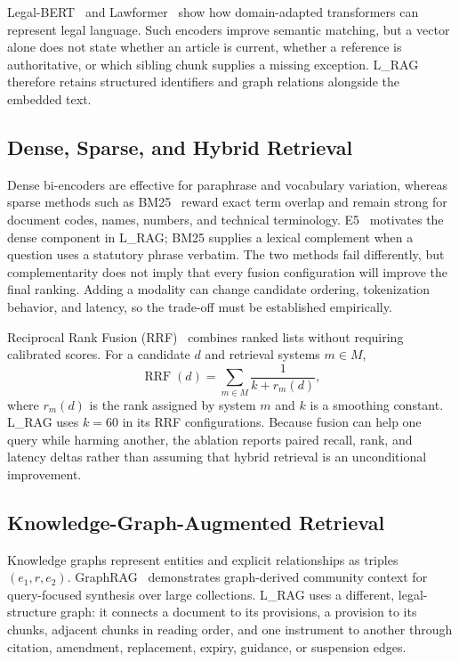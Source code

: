 Legal-BERT~\cite{chalkidis2020legal_bert} and Lawformer~\cite{xiao2021lawformer}
show how domain-adapted transformers can represent legal language. Such
encoders improve semantic matching, but a vector alone does not state whether
an article is current, whether a reference is authoritative, or which sibling
chunk supplies a missing exception. L\_RAG therefore retains structured
identifiers and graph relations alongside the embedded text.

\subsection{Dense, Sparse, and Hybrid Retrieval}
\label{sec:related-hybrid}

Dense bi-encoders are effective for paraphrase and vocabulary variation,
whereas sparse methods such as BM25~\cite{robertson2009probabilistic} reward
exact term overlap and remain strong for document codes, names, numbers, and
technical terminology. E5~\cite{wang2022e5} motivates the dense component in
L\_RAG; BM25 supplies a lexical complement when a question uses a statutory
phrase verbatim. The two methods fail differently, but complementarity does
not imply that every fusion configuration will improve the final ranking.
Adding a modality can change candidate ordering, tokenization behavior, and
latency, so the trade-off must be established empirically.

Reciprocal Rank Fusion (RRF)~\cite{cormack2009reciprocal} combines ranked
lists without requiring calibrated scores. For a candidate $d$ and retrieval
systems $m \in M$,
\begin{equation}
    \operatorname{RRF}(d)=\sum_{m\in M}\frac{1}{k+r_m(d)},
\end{equation}
where $r_m(d)$ is the rank assigned by system $m$ and $k$ is a smoothing
constant. L\_RAG uses $k=60$ in its RRF configurations. Because fusion can
help one query while harming another, the ablation reports paired recall,
rank, and latency deltas rather than assuming that hybrid retrieval is an
unconditional improvement.

\subsection{Knowledge-Graph-Augmented Retrieval}
\label{sec:related-graph}

Knowledge graphs represent entities and explicit relationships as triples
$(e_1,r,e_2)$. GraphRAG~\cite{edge2024graphrag} demonstrates graph-derived
community context for query-focused synthesis over large collections. L\_RAG
uses a different, legal-structure graph: it connects a document to its
provisions, a provision to its chunks, adjacent chunks in reading order, and
one instrument to another through citation, amendment, replacement, expiry,
guidance, or suspension edges.

